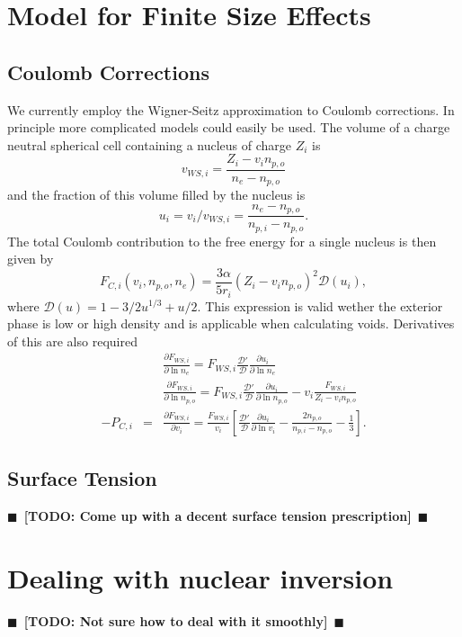 \documentclass[11pt,letter]{article}
\newcommand{\pd}[2]{\frac{\partial #1}{\partial #2}}
\newcommand{\todo}[1]{{$\blacksquare$~\textbf{\color{blue}[TODO: #1]}}~$\blacksquare$}
\begin{document}
\section{Model for Finite Size Effects}
\subsection{Coulomb Corrections} 
We currently employ the Wigner-Seitz approximation to Coulomb corrections.  In
principle more complicated models could easily be used.  The volume of a charge
neutral spherical cell containing a nucleus of charge $Z_i$ is 
\begin{equation} 
v_{WS,i} = \frac{Z_i - v_i n_{p,o}}{n_e - n_{p,o}}
\end{equation}
and the fraction of this volume filled by the nucleus is 
\begin{equation}
u_i = v_i/v_{WS,i} = \frac{n_e - n_{p,o}}{n_{p,i} - n_{p,o}}. 
\end{equation} 
The total Coulomb contribution to the free energy for a single nucleus is then
given by
\begin{equation}
F_{C,i}(v_i, n_{p,o}, n_e) = \frac{3\alpha}{5 r_i} \left(Z_i - v_i n_{p,o}\right)^2 
\mathcal{D}(u_i),
\end{equation} 
where $\mathcal{D}(u) = 1 - 3/2 u^{1/3} + u/2$.  This expression is valid wether
the exterior phase is low or high density and is applicable when calculating
voids.  Derivatives of this are also required 
\begin{eqnarray}
&& \pd{F_{WS,i}}{\ln n_e} = F_{WS,i} \frac{\mathcal{D}'}{\mathcal{D}}
\pd{u_i}{\ln n_e} \\
&& \pd{F_{WS,i}}{\ln n_{p,o}} = F_{WS,i} \frac{\mathcal{D}'}{\mathcal{D}}
\pd{u_i}{\ln n_{p,o}} - v_i \frac{F_{WS,i}}{Z_i - v_i n_{p,o}}\\
-P_{C,i} &=&  \pd{F_{WS,i}}{v_i} = \frac{F_{WS,i}}{v_i} 
\left[ \frac{\mathcal{D}'}{\mathcal{D}}  \pd{u_i}{\ln v_i} 
- \frac{2n_{p,o}}{n_{p,i} - n_{p,o}} - \frac{1}{3} \right].
\end{eqnarray}
  
\subsection{Surface Tension}
\todo{Come up with a decent surface tension prescription}

\section{Dealing with nuclear inversion}
\todo{Not sure how to deal with it smoothly} 
\end{document}

